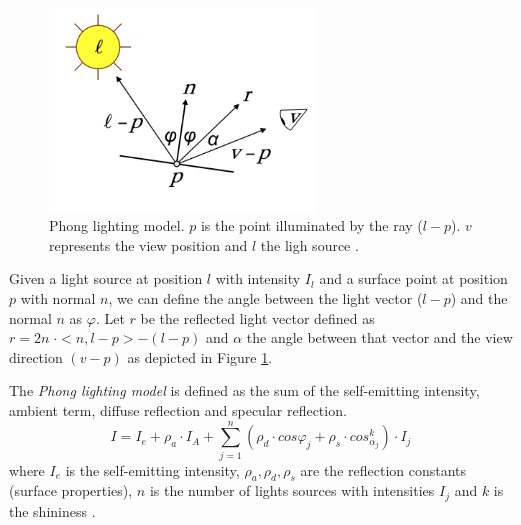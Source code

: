 \begin{figure}[h!]
  \centering
  \includegraphics[width=7cm]{images/lighting}
\caption{Phong lighting model. $p$ is the point illuminated by the ray ($l-p$). $v$ represents the view position and $l$ the ligh source \cite{SLIDE:ICORSI}.} \label{figure:lighting}
\end{figure}
Given a light source at position $l$ with intensity $I_l$ and a surface point at position $p$ with normal $n$,
we can define the angle between the light vector ($l-p$) and the normal $n$ as $\varphi$.
Let $r$ be the reflected light vector defined as $r = 2 n \; \cdot <n, l - p> - (l-p)$ and $\alpha$ the angle between that vector and the view direction $(v - p)$ as depicted in Figure \ref{figure:lighting}.

The \textit{Phong lighting model} is defined as the sum of the self-emitting intensity, ambient term, diffuse reflection and specular reflection.
$$ I = I_e + {\rho}_a \cdot I_A + \sum_{j=1}^n ({\rho}_d \cdot cos {\varphi}_j + {\rho}_s \cdot cos_{\alpha_j}^k) \cdot I_j$$ where $I_e$ is the self-emitting intensity, ${\rho}_a, {\rho}_d, {\rho}_s$ are the reflection constants (surface properties), $n$ is the number of lights sources with intensities $I_j$ and $k$ is the shininess \cite{SLIDE:ICORSI}.


